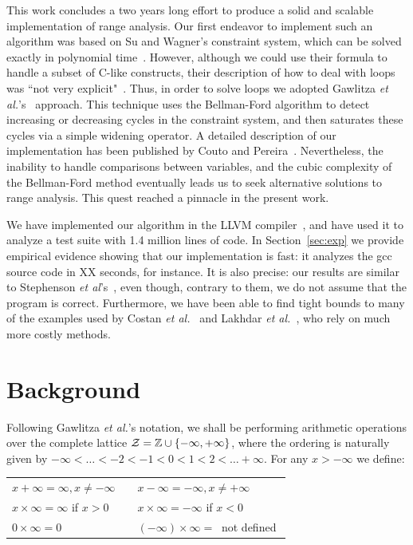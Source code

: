 \documentclass{llncs}
\begin{document}
This work concludes a two years long effort to produce a solid and scalable
implementation of range analysis.
Our first endeavor to implement such an algorithm was based on Su and
Wagner's constraint system, which can be solved exactly in polynomial
time~\cite{Su04,Su05}.
However, although we could use their formula to handle a subset of C-like
constructs, their description of how to deal with loops was
``not very explicit"~\cite[p.422]{Gawlitza09}.
Thus, in order to solve loops we adopted Gawlitza
{\em et al.}'s~\cite{Gawlitza09} approach.
This technique uses the Bellman-Ford algorithm to detect increasing or
decreasing cycles in the constraint system, and then saturates these cycles
via a simple widening operator.
A detailed description of our implementation has been published by
Couto and Pereira~\cite{Couto11}.
Nevertheless, the inability to handle comparisons between variables, and the
cubic complexity of the Bellman-Ford method eventually leads us to seek
alternative solutions to range analysis.
This quest reached a pinnacle in the present work.

We have implemented our algorithm in the LLVM compiler~\cite{Lattner04}, and
have used it to analyze a test suite with 1.4 million lines of code.
In Section~\ref{sec:exp} we provide empirical evidence showing that our
implementation is fast: it analyzes the gcc source code in XX seconds, for
instance.
It is also precise: our results are similar to Stephenson
{\em et al}'s~\cite{Stephenson00}, even though, contrary to them, we do not
assume that the program is correct.
Furthermore, we have been able to find tight bounds to many of the examples
used by Costan {\em et al.}~\cite{Costan05} and Lakhdar
{\em et al.}~\cite{Lakhdar11}, who rely on much more costly methods.


\section{Background}
\label{sec:bck}

Following Gawlitza {\em et al.}'s notation, we shall be performing arithmetic
operations over the complete lattice
$\cal{Z} = \mathbb{Z} \cup \{-\infty, +\infty\}$, where the ordering is
naturally given by $-\infty < \ldots < -2 < -1 < 0 < 1 < 2 < \ldots +\infty$.
For any $x > -\infty$ we define:

\begin{tabular}{lcl}
$x + \infty = \infty, x \neq -\infty$ & \mbox{\hspace{0.1cm}} & $x - \infty = - \infty, x \neq +\infty$ \\
$x \times \infty = \infty$ if $x > 0$ & & $x \times \infty = -\infty$ if $x < 0$ \\
$0 \times \infty = 0$ & & $(-\infty) \times \infty = \ $ not defined $$ \\
\end{tabular}
\end{document}
